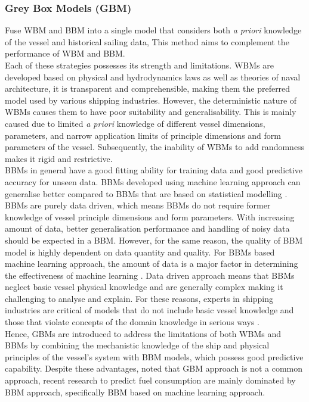 \subsubsection*{\textbf{Grey Box Models (GBM)}} Fuse WBM and BBM into a single model that considers both \emph{a priori} knowledge of the vessel and historical sailing data, This method aims to complement the performance of WBM and BBM.\\

Each of these strategies possesses its strength and limitations. WBMs are developed based on physical and hydrodynamics laws as well as theories of naval architecture, it is transparent and comprehensible, making them the preferred model used by various shipping industries. However, the deterministic nature of WBMs causes them to have poor suitability and generalisability. This is mainly caused due to limited \emph{a priori} knowledge of different vessel dimensions, parameters, and narrow application limits of principle dimensions and form parameters of the vessel. Subsequently, the inability of WBMs to add randomness makes it rigid and restrictive. \\

BBMs in general have a good fitting ability for training data and good predictive accuracy for unseen data. BBMs developed using machine learning approach can generalise better compared to BBMs that are based on statistical modelling . BBMs are purely data driven, which means BBMs do not require former knowledge of vessel principle dimensions and form parameters. With increasing amount of data, better generalisation performance and handling of noisy data should be expected in a BBM. However, for the same reason, the quality of BBM model is highly dependent on data quantity and quality. For BBMs based machine learning approach, the amount of data is a major factor in determining the effectiveness of machine learning . Data driven approach means that BBMs neglect basic vessel physical knowledge and are generally complex making it challenging to analyse and explain. For these reasons, experts in shipping industries are critical of models that do not include basic vessel knowledge and those that violate concepts of the domain knowledge in serious ways .\\   

Hence, GBMs are introduced to address the limitations of both WBMs and BBMs by combining the mechanistic knowledge of the ship and physical principles of the vessel's system with BBM models, which possess good predictive capability. Despite these advantages,  noted that GBM approach is not a common approach, recent research to predict fuel consumption are mainly dominated by BBM approach, specifically BBM based on machine learning approach.\\

